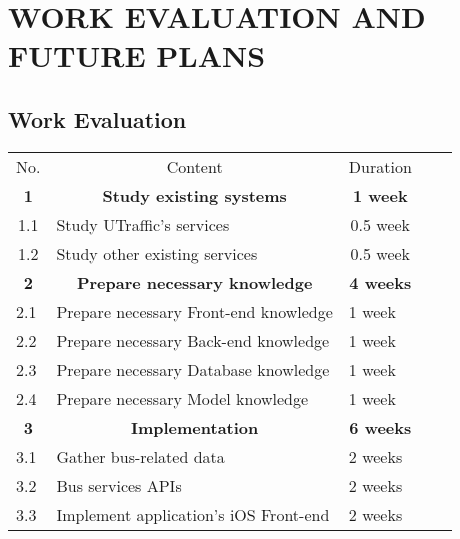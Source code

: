 \section{WORK EVALUATION AND FUTURE PLANS}

\subsection{Work Evaluation}

\begin{table}[H]
    \centering
    \begin{tabular}{|l|l|l|ll}
    \cline{1-3}
    \multicolumn{1}{|c|}{No.} & \multicolumn{1}{c|}{Content}          & \multicolumn{1}{c|}{Duration} &  &  \\ \cline{1-3}
    \multicolumn{1}{|c|}{\textbf{1}} & \multicolumn{1}{c|}{\textbf{Study existing systems}}      & \multicolumn{1}{c|}{\textbf{1 week}}  &           &           \\ \cline{1-3}
    \multicolumn{1}{|c|}{1.1} & Study UTraffic's services             & \multicolumn{1}{c|}{0.5 week} &  &  \\ \cline{1-3}
    \multicolumn{1}{|c|}{1.2} & Study other existing services         & \multicolumn{1}{c|}{0.5 week} &  &  \\ \cline{1-3}
    \multicolumn{1}{|c|}{\textbf{2}} & \multicolumn{1}{c|}{\textbf{Prepare necessary knowledge}} & \multicolumn{1}{c|}{\textbf{4 weeks}} & \textbf{} & \textbf{} \\ \cline{1-3}
    2.1                       & Prepare necessary Front-end knowledge & 1 week                        &  &  \\ \cline{1-3}
    2.2                       & Prepare necessary Back-end knowledge  & 1 week                        &  &  \\ \cline{1-3}
    2.3                       & Prepare necessary Database knowledge  & 1 week                        &  &  \\ \cline{1-3}
    2.4                       & Prepare necessary Model knowledge     & 1 week                        &  &  \\ \cline{1-3}
    \multicolumn{1}{|c|}{\textbf{3}} & \multicolumn{1}{c|}{\textbf{Implementation}}              & \multicolumn{1}{c|}{\textbf{6 weeks}} & \textbf{} & \textbf{} \\ \cline{1-3}
    3.1                       & Gather bus-related data               & 2 weeks                       &  &  \\ \cline{1-3}
    3.2                       & Bus services APIs                     & 2 weeks                       &  &  \\ \cline{1-3}
    3.3                       & Implement application's iOS Front-end & 2 weeks                       &  &  \\ \cline{1-3}
    \end{tabular}
    \end{table}

